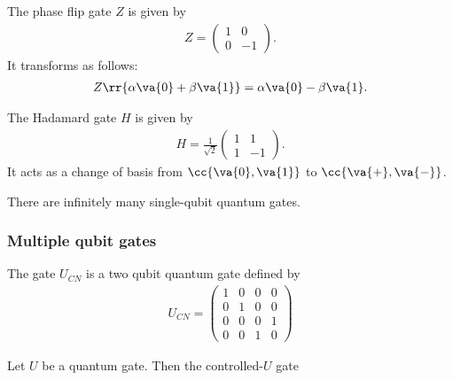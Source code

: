 \documentclass{article}
\begin{document}
\begin{definition}
	\label{def:phase-flip}
	The phase flip gate $Z$ is given by
	\begin{align*}
		Z = \begin{pmatrix} 1 & 0 \\ 0 & -1 \end{pmatrix}.
	\end{align*}
	It transforms as follows:
	\begin{align*}
		Z \rr{\alpha\va{0} + \beta\va{1}} = \alpha\va{0} - \beta\va{1}.
	\end{align*}
\end{definition}


\begin{definition}
	\label{def:hadamard}
	The Hadamard gate $H$ is given by
	\begin{align*}
		H = \frac{1}{\sqrt{2}} \begin{pmatrix} 1 & 1 \\ 1 & -1 \end{pmatrix}.
	\end{align*}
	It acts as a change of basis from $ \cc{ \va{ 0 }, \va{ 1 } } $ to $ \cc{ \va{ + }, \va{ - } }$.
\end{definition}

\begin{theorem}
	\label{thm:infinite-gates}
	There are infinitely many single-qubit quantum gates.
\end{theorem}

\subsubsection{Multiple qubit gates}
\label{sec:multiple-qubit-gates}

\begin{definition}
	\label{def:cnot}
	The  gate $U_{CN}$ is a two qubit quantum gate defined by
	\begin{align*}
		U_{CN} = \begin{pmatrix}
			         1 & 0 & 0 & 0 \\
			         0 & 1 & 0 & 0 \\
			         0 & 0 & 0 & 1 \\
			         0 & 0 & 1 & 0
		         \end{pmatrix}
	\end{align*}
\end{definition}

\begin{definition}
	\label{def:controlled-u}
	Let $U$ be a quantum gate. Then the controlled-$U$ gate
\end{definition}
\end{document}
